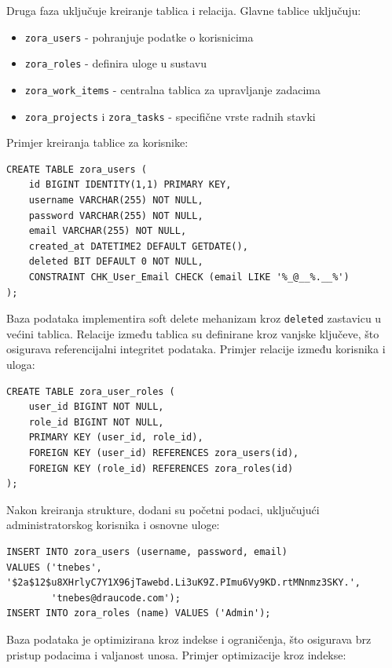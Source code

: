 \documentclass[a4paper,12pt]{article}
\begin{document}
Druga faza uključuje kreiranje tablica i relacija. Glavne tablice uključuju:

\begin{itemize}
    \item \texttt{zora\_users} - pohranjuje podatke o korisnicima
    \item \texttt{zora\_roles} - definira uloge u sustavu
    \item \texttt{zora\_work\_items} - centralna tablica za upravljanje zadacima
    \item \texttt{zora\_projects} i \texttt{zora\_tasks} - specifične vrste radnih stavki
\end{itemize}

Primjer kreiranja tablice za korisnike:

\begin{lstlisting}[style=sqlstyle]
CREATE TABLE zora_users (
    id BIGINT IDENTITY(1,1) PRIMARY KEY,
    username VARCHAR(255) NOT NULL,
    password VARCHAR(255) NOT NULL,
    email VARCHAR(255) NOT NULL,
    created_at DATETIME2 DEFAULT GETDATE(),
    deleted BIT DEFAULT 0 NOT NULL,
    CONSTRAINT CHK_User_Email CHECK (email LIKE '%_@__%.__%')
);
\end{lstlisting}

Baza podataka implementira soft delete mehanizam kroz \texttt{deleted} zastavicu u većini tablica. Relacije između tablica su definirane kroz vanjske ključeve, što osigurava referencijalni integritet podataka. Primjer relacije između korisnika i uloga:

\begin{lstlisting}[style=sqlstyle]
CREATE TABLE zora_user_roles (
    user_id BIGINT NOT NULL,
    role_id BIGINT NOT NULL,
    PRIMARY KEY (user_id, role_id),
    FOREIGN KEY (user_id) REFERENCES zora_users(id),
    FOREIGN KEY (role_id) REFERENCES zora_roles(id)
);
\end{lstlisting}

Nakon kreiranja strukture, dodani su početni podaci, uključujući administratorskog korisnika i osnovne uloge:

\begin{lstlisting}[style=sqlstyle]
INSERT INTO zora_users (username, password, email) 
VALUES ('tnebes', '$2a$12$u8XHrlyC7Y1X96jTawebd.Li3uK9Z.PImu6Vy9KD.rtMNnmz3SKY.', 
        'tnebes@draucode.com');
INSERT INTO zora_roles (name) VALUES ('Admin');
\end{lstlisting}

Baza podataka je optimizirana kroz indekse i ograničenja, što osigurava brz pristup podacima i valjanost unosa. Primjer optimizacije kroz indekse:
\end{document}
